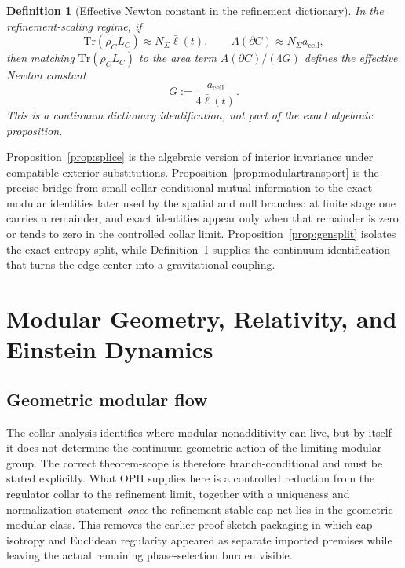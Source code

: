 \documentclass[11pt]{article}
\newtheorem{definition}[theorem]{Definition}
\begin{document}
\begin{definition}[Effective Newton constant in the refinement dictionary]\label{def:newton}
In the refinement-scaling regime, if
\[
\mathrm{Tr}(\rho_C L_C)\approx N_\Sigma \bar\ell(t),
\qquad
A(\partial C)\approx N_\Sigma a_{\mathrm{cell}},
\]
then matching $\mathrm{Tr}(\rho_C L_C)$ to the area term $A(\partial C)/(4G)$ defines the effective Newton constant
\[
G:=\frac{a_{\mathrm{cell}}}{4\bar\ell(t)}.
\]
This is a continuum dictionary identification, not part of the exact algebraic proposition.
\end{definition}

Proposition~\ref{prop:splice} is the algebraic version of interior invariance under compatible exterior substitutions. Proposition~\ref{prop:modulartransport} is the precise bridge from small collar conditional mutual information to the exact modular identities later used by the spatial and null branches: at finite stage one carries a remainder, and exact identities appear only when that remainder is zero or tends to zero in the controlled collar limit. Proposition~\ref{prop:gensplit} isolates the exact entropy split, while Definition~\ref{def:newton} supplies the continuum identification that turns the edge center into a gravitational coupling.

\section{Modular Geometry, Relativity, and Einstein Dynamics}\label{sec:gravity}

\subsection{Geometric modular flow}

The collar analysis identifies where modular nonadditivity can live, but by itself it does not determine the continuum geometric action of the limiting modular group. The correct theorem-scope is therefore branch-conditional and must be stated explicitly. What OPH supplies here is a controlled reduction from the regulator collar to the refinement limit, together with a uniqueness and normalization statement \emph{once} the refinement-stable cap net lies in the geometric modular class. This removes the earlier proof-sketch packaging in which cap isotropy and Euclidean regularity appeared as separate imported premises while leaving the actual remaining phase-selection burden visible.
\end{document}
